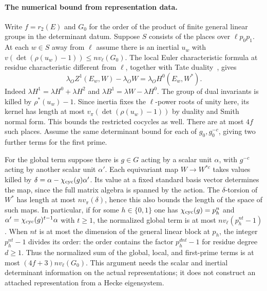 \paragraph{The numerical bound from representation data.}
Write $f=r_2(E)$ and $G_0$ for the order of the product of finite general
linear groups in the determinant datum. Suppose $S$ consists of the places
over $\ell p_0p_1$. At each $w\in S$ away from $\ell$ assume there is an
inertial $u_w$ with $v(\det(\rho(u_w)-1))\le n v_\ell(G_0)$. The local
Euler characteristic formula at residue characteristic different from $\ell$,
together with Tate duality~\cite[Part~I]{milneADT}, gives
\[
 \lambda_O Z^1(E_w,W)-\lambda_O W=\lambda_O H^0(E_w,W^*).
\]
Indeed $\lambda H^1=\lambda H^0+\lambda H^2$ and
$\lambda B^1=\lambda W-\lambda H^0$. The group of dual invariants is
killed by $\rho^*(u_w)-1$. Since inertia fixes the $\ell$-power roots of
unity here, its kernel has length at most $v_\pi(\det(\rho(u_w)-1))$
by duality and Smith normal form. This bounds the restricted cocycles
as well. There are at most $4f$ such places. Assume the same determinant
bound for each of $g_0,g_0^{-c}$, giving two further terms for the first
prime.

For the global term suppose there is $g\in G$ acting by a scalar unit
$\alpha$, with $g^{-c}$ acting by another scalar unit $\alpha'$.
Each equivariant map $W\to W^{*c}$ takes values killed by
$\delta=\alpha-\chi_{\rm cyc}(g)\alpha'$.
Its value at a fixed standard basis vector determines the map, since
the full matrix algebra is spanned by the action. The $\delta$-torsion
of $W^*$ has length at most $n v_\pi(\delta)$, hence this also bounds
the length of the space of such maps. In particular, if for some
$h\in\{0,1\}$ one has $\chi_{\rm cyc}(g)=p_h^n$ and
$\alpha'=\chi_{\rm cyc}(g)^{t-1}\alpha$ with $t\ge1$, the normalized
global term is at most $n v_\ell(p_h^{nt}-1)$. When $nt$ is at most
the dimension of the general linear block at $p_h$, the integer
$p_h^{nt}-1$ divides its order: the order contains the factor
$p_h^{d nt}-1$ for residue degree $d\ge1$. Thus the normalized sum of the
global, local, and first-prime terms is at most
$(4f+3)n v_\ell(G_0)$. This argument needs the scalar and inertial
determinant information on the actual representations; it does not
construct an attached representation from a Hecke eigensystem.

